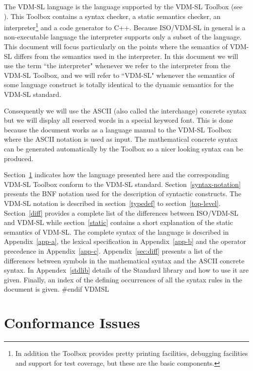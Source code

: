 \documentclass[\pformat,12pt]{article}
\begin{document}
The  VDM-SL language is the language supported by the  VDM-SL
Toolbox (see \cite{UserMan-SCSK}). This Toolbox contains a syntax checker,
a static semantics checker, an interpreter\footnote{In addition the
Toolbox provides pretty printing facilities, debugging facilities and
support for test coverage, but these are the basic components.} and a
code generator to C++. Because ISO/VDM-SL in general is a
non-executable language the interpreter supports only a subset of the
language. This document will focus particularly on the points where
the semantics of VDM-SL differs from the semantics used in the
interpreter. In this document we will use the term ``the interpreter"
whenever we refer to the interpreter from the  VDM-SL Toolbox, and
we will refer to ``VDM-SL" whenever the semantics of some language
construct is totally identical to the dynamic semantics for the VDM-SL
standard.

Consequently we will use the ASCII (also called the interchange)
concrete syntax but we will display all reserved words in a special
keyword font. This is done because the document works as a language
manual to the  VDM-SL Toolbox where the ASCII notation is used as
input. The mathematical concrete syntax can be generated automatically
by the Toolbox so a nicer looking syntax can be produced.

Section~\ref{conformance} indicates how the language presented here and the
corresponding  VDM-SL Toolbox conform to the VDM-SL standard.
Section~\ref{syntax-notation} presents the BNF notation used
for the description of syntactic constructs.  The  VDM-SL
notation is described in section~\ref{typedef} to
section~\ref{top-level}.
Section~\ref{diff} provides a complete list of the differences between
ISO/VDM-SL and  VDM-SL while section~\ref{static} contains a
short explanation of the static semantics of VDM-SL.
The complete syntax of the language is described in Appendix~\ref{app-a}, the
lexical specification in Appendix~\ref{app-b} and the operator precedence
in Appendix~\ref{app-c}. Appendix~\ref{sec:diff} presents a list of the
differences between symbols in the mathematical syntax and the ASCII
concrete syntax. In Appendex~\ref{stdlib} details of the Standard
library and how to use it are given. Finally, an index of the defining
occurrences of 
all the syntax rules in the document is given. 
#endif VDMSL

\section{Conformance Issues}
\label{conformance}
\end{document}
